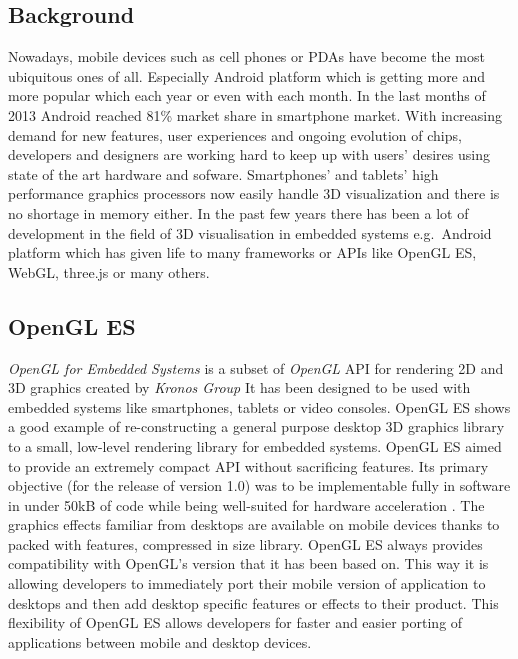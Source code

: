 \subsection{Background}
Nowadays, mobile devices such as cell phones or PDAs have become the most ubiquitous ones of all.
Especially Android platform which is getting more and more popular which each year or even with each month.
In the last months of 2013 Android reached 81\% market share in smartphone market.
With increasing demand for new features, user experiences and ongoing evolution of chips,  developers and designers are working hard to keep up with users' desires using state of the art hardware and sofware.
Smartphones’ and tablets’ high performance graphics processors now easily handle 3D visualization and there is no shortage in memory either.
In the past few years there has been a lot of development in the field of 3D visualisation in embedded systems e.g.\ Android platform which has given life to many frameworks or APIs like OpenGL ES, WebGL, three.js or many others.

\subsection{OpenGL ES}
\emph{OpenGL for Embedded Systems} \cite{opengles_kronos} is a subset of \emph{OpenGL} \cite{opengl_kronos} API for rendering 2D and 3D graphics created by \emph{Kronos Group} \cite{kronos_group} 
It has been designed to be used with embedded systems like smartphones, tablets or video consoles.
OpenGL ES shows a good example of re-constructing a general purpose desktop 3D graphics library to a small, low-level rendering library for embedded systems.
OpenGL ES aimed to provide an extremely compact API without sacrificing features.
Its primary objective (for the release of version 1.0) was to be implementable fully in software in under 50kB of code while being well-suited for hardware acceleration \cite{mobile_3d_graphics_with_OGLES_M3G}.
The graphics effects familiar from desktops are available on mobile devices thanks to packed with features, compressed in size library.
\newline OpenGL ES always provides compatibility with OpenGL's version that it has been based on.
This way it is allowing developers to immediately port their mobile version of application to desktops and then add desktop specific features or effects to their product.
This flexibility of OpenGL ES allows developers for faster and easier porting of applications between mobile and desktop devices.

